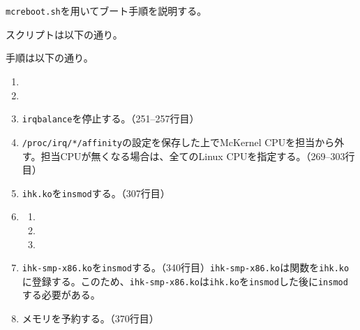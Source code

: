 \documentclass[twoside,11pt,fleqn]{book}
\begin{document}
\subsection{}

\section{}
\texttt{mcreboot.sh}を用いてブート手順を説明する。

スクリプトは以下の通り。
\nolinenumbers
\scriptsize

\normalsize
\linenumbers

手順は以下の通り。
\begin{enumerate}
\item {}
\item {}
\item \texttt{irqbalance}を停止する。（251--257行目）
\item \texttt{/proc/irq/*/affinity}の設定を保存した上でMcKernel CPUを担当から外す。担当CPUが無くなる場合は、全てのLinux CPUを指定する。（269--303行目）
\item \texttt{ihk.ko}を\texttt{insmod}する。（307行目）
\item {}
\begin{enumerate}
\item {}
\item {}
\item {}
\end{enumerate}
\item \texttt{ihk-smp-x86.ko}を\texttt{insmod}する。（340行目）\texttt{ihk-smp-x86.ko}は関数を\texttt{ihk.ko}に登録する。このため、\texttt{ihk-smp-x86.ko}は\texttt{ihk.ko}を\texttt{insmod}した後に\texttt{insmod}する必要がある。
\item メモリを予約する。（370行目）

\end{enumerate}
\end{document}

